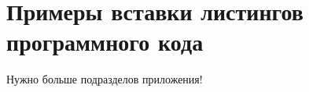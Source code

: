 \chapter{Примеры вставки листингов программного кода}\label{app:A}

Нужно больше подразделов приложения!

\clearpage
{}


